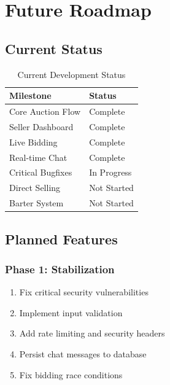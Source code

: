\documentclass[12pt,a4paper]{report}
\begin{document}
\chapter{Future Roadmap}

\section{Current Status}

\begin{table}[H]
\centering
\begin{tabularx}{\textwidth}{|X|l|}
\hline
\textbf{Milestone} & \textbf{Status} \\
\hline
Core Auction Flow & \textcolor{secondary}{Complete} \\
\hline
Seller Dashboard & \textcolor{secondary}{Complete} \\
\hline
Live Bidding & \textcolor{secondary}{Complete} \\
\hline
Real-time Chat & \textcolor{secondary}{Complete} \\
\hline
Critical Bugfixes & \textcolor{accent}{In Progress} \\
\hline
Direct Selling & \textcolor{danger}{Not Started} \\
\hline
Barter System & \textcolor{danger}{Not Started} \\
\hline
\end{tabularx}
\caption{Current Development Status}
\end{table}

\section{Planned Features}

\subsection{Phase 1: Stabilization}

\begin{enumerate}
    \item Fix critical security vulnerabilities
    \item Implement input validation
    \item Add rate limiting and security headers
    \item Persist chat messages to database
    \item Fix bidding race conditions
\end{enumerate}
\end{document}
